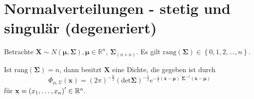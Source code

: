 \documentclass{tstextbook}
\begin{document}
\section{Normalverteilungen - stetig und singulär (degeneriert)}


Betrachte $ \mathbf{X} \sim N(\boldsymbol{\mu}, \boldsymbol{\Sigma}),\boldsymbol{\mu} \in \mathbb{R}^n $, $ \boldsymbol{\Sigma}_{(n\times n)} $. Es gilt $ \text{rang}(\boldsymbol{\Sigma})\in \left\lbrace 0, 1, 2,\ldots, n\right\rbrace  $.

\begin{theorem}
	
	Ist $ \text{rang}(\boldsymbol{\Sigma})=n $, dann besitzt $ \mathbf{X} $  eine Dichte, die gegeben ist durch
	\[ \Phi_{\mu, \Sigma} (\mathbf{x}) = (2\pi)^{-\frac{n}{2}} (\text{det} \boldsymbol{\Sigma})^{-\frac{1}{2}} e^{-\frac{1}{2}(\mathbf{x}-\boldsymbol{\mu})^\prime\boldsymbol{\Sigma}^{-1}(\mathbf{x}-\boldsymbol{\mu})} \] für $ \mathbf{x} = \left( x_1,\ldots, x_n \right)^{\prime} \in \mathbb R^n. $
\end{theorem}
\end{document}
